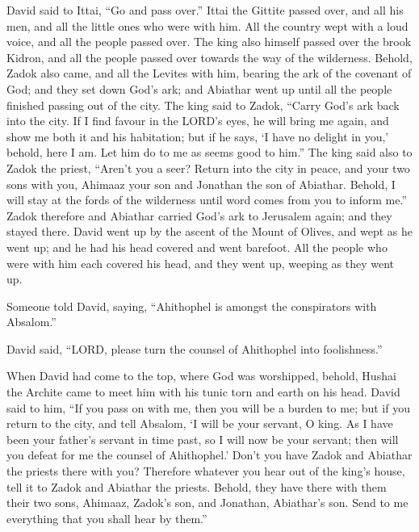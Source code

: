  David said to Ittai, ``Go and pass over.'' Ittai the
Gittite passed over, and all his men, and all the little ones who were
with him.  All the country wept with a loud voice, and all
the people passed over. The king also himself passed over the brook
Kidron, and all the people passed over towards the way of the
wilderness.  Behold, Zadok also came, and all the Levites
with him, bearing the ark of the covenant of God; and they set down
God's ark; and Abiathar went up until all the people finished passing
out of the city.  The king said to Zadok, ``Carry God's ark
back into the city. If I find favour in the LORD's eyes, he will bring
me again, and show me both it and his habitation;  but if
he says, `I have no delight in you,' behold, here I am. Let him do to me
as seems good to him.''  The king said also to Zadok the
priest, ``Aren't you a seer? Return into the city in peace, and your two
sons with you, Ahimaaz your son and Jonathan the son of Abiathar.
 Behold, I will stay at the fords of the wilderness until
word comes from you to inform me.''  Zadok therefore and
Abiathar carried God's ark to Jerusalem again; and they stayed there.
 David went up by the ascent of the Mount of Olives, and
wept as he went up; and he had his head covered and went barefoot. All
the people who were with him each covered his head, and they went up,
weeping as they went up.

 Someone told David, saying, ``Ahithophel is amongst the
conspirators with Absalom.''

David said, ``LORD, please turn the counsel of Ahithophel into
foolishness.''

 When David had come to the top, where God was worshipped,
behold, Hushai the Archite came to meet him with his tunic torn and
earth on his head.  David said to him, ``If you pass on
with me, then you will be a burden to me;  but if you
return to the city, and tell Absalom, `I will be your servant, O king.
As I have been your father's servant in time past, so I will now be your
servant; then will you defeat for me the counsel of Ahithophel.'
 Don't you have Zadok and Abiathar the priests there with
you? Therefore whatever you hear out of the king's house, tell it to
Zadok and Abiathar the priests.  Behold, they have there
with them their two sons, Ahimaaz, Zadok's son, and Jonathan, Abiathar's
son. Send to me everything that you shall hear by them.''

